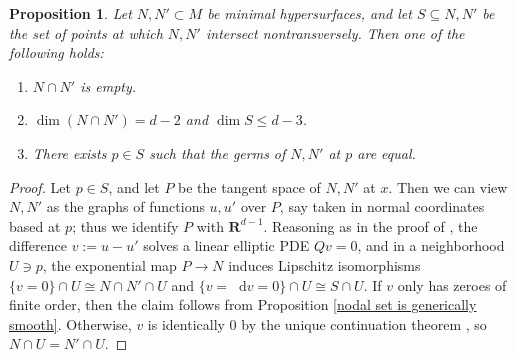 \documentclass[reqno,11pt]{amsart}
\newcommand{\RR}{\mathbf{R}}
\newcommand*\dif{\mathop{}\!\mathrm{d}}
\newtheorem{proposition}[theorem]{Proposition}
\theoremstyle{definition}
\numberwithin{equation}{section}
\begin{document}
\begin{proposition}\label{intersection theory prop}
Let $N, N' \subset M$ be minimal hypersurfaces, and let $S \subseteq N, N'$ be the set of points at which $N, N'$ intersect nontransversely.
Then one of the following holds:
\begin{enumerate}
\item $N \cap N'$ is empty.
\item $\dim(N \cap N') = d - 2$ and $\dim S \leq d - 3$.
\item There exists $p \in S$ such that the germs of $N, N'$ at $p$ are equal.
\end{enumerate}
\end{proposition}
\begin{proof}
Let $p \in S$, and let $P$ be the tangent space of $N, N'$ at $x$.
Then we can view $N, N'$ as the graphs of functions $u, u'$ over $P$, say taken in normal coordinates based at $p$; thus we identify $P$ with $\RR^{d - 1}$.
Reasoning as in the proof of \cite[Theorem 7.3]{colding2011course}, the difference $v := u - u'$ solves a linear elliptic PDE $Qv = 0$, and in a neighborhood $U \ni p$, the exponential map $P \to N$ induces Lipschitz isomorphisms $\{v = 0\} \cap U \cong N \cap N' \cap U$ and $\{v = \dif v = 0\} \cap U \cong S \cap U$.
If $v$ only has zeroes of finite order, then the claim follows from Proposition \ref{nodal set is generically smooth}.
Otherwise, $v$ is identically $0$ by the unique continuation theorem \cite[Theorem 6.1]{colding2011course}, so $N \cap U = N' \cap U$.
\end{proof}

\end{document}

